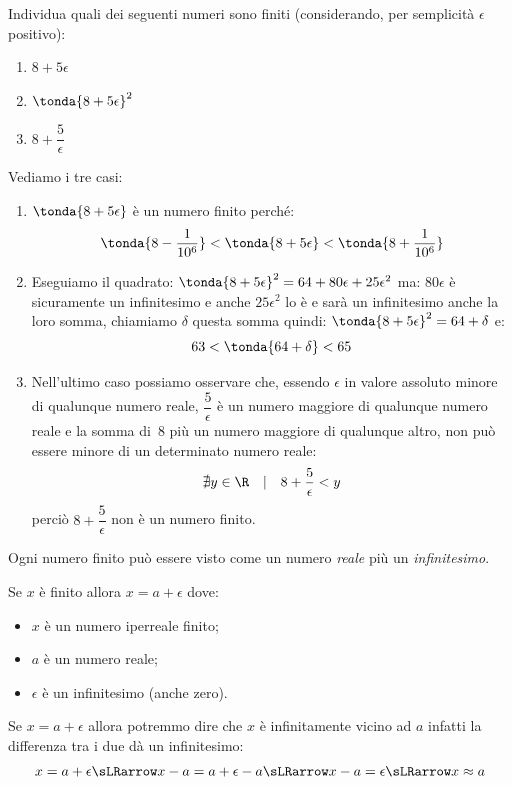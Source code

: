 \begin{esempio}
 Individua quali dei seguenti numeri sono finiti (considerando, per 
semplicità \(\epsilon\) positivo):

\begin{multicols}{3}
\begin{enumerate}
 \item \(8+5\epsilon\)
 \item \(\tonda{8+5\epsilon}^2\)
 \item \(8+\dfrac{5}{\epsilon}\)
\end{enumerate}
\end{multicols}

Vediamo i tre casi:

\begin{enumerate}
 \item \(\tonda{8+5\epsilon}\) è un numero finito perché:
 \[\tonda{8-\dfrac{1}{10^6}} < \tonda{8+5\epsilon} < 
   \tonda{8+\dfrac{1}{10^6}}\]
 \item Eseguiamo il quadrato:
 \(\tonda{8+5\epsilon}^2 = 64 +80 \epsilon +25 \epsilon^2\)
 ma: \(80 \epsilon\) è sicuramente un infinitesimo e anche \(25 \epsilon^2\)
 lo è e sarà un infinitesimo anche la loro somma, chiamiamo \(\delta\) 
questa somma quindi: 
\(\tonda{8+5\epsilon}^2 = 64 + \delta\)
e: 
\[63 < \tonda{64 + \delta} < 65\]
 \item Nell'ultimo caso possiamo osservare che, essendo \(\epsilon\) in 
valore assoluto minore di qualunque numero reale, 
 \(\dfrac{5}{\epsilon}\) è un numero maggiore di qualunque numero reale e 
la somma di~8 più un numero maggiore di qualunque altro, non può essere 
minore di un determinato numero reale:
 \[\nexists y \in \R \quad | \quad 8+\dfrac{5}{\epsilon} < y\]
perciò \(8+\dfrac{5}{\epsilon}\) non è un numero finito.
\end{enumerate}
\end{esempio}

\noindent Ogni numero finito può essere visto come un numero \emph{reale} 
più un \emph{infinitesimo}.

Se $x$ è finito allora $x = a + \epsilon$ dove:
\begin{itemize} [noitemsep]
 \item \(x\) è un numero iperreale finito;
 \item \(a\) è un numero reale;
 \item \(\epsilon\) è un infinitesimo (anche zero).
\end{itemize}

Se \(x=a+\epsilon\) allora potremmo dire che \(x\) è infinitamente vicino 
ad \(a\) infatti la differenza tra i due dà un infinitesimo: 
\[x=a+\epsilon \sLRarrow
x-a = a+\epsilon-a \sLRarrow x-a = \epsilon \sLRarrow x \approx a\] 

